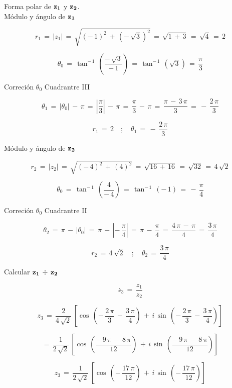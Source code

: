 \documentclass[a4paper,11pt,openany]{book}
\begin{document}
\textcolor{ao(english)}{} Forma polar de $\bf{z_{1}}$ y $\bf{z_{2}}$.\\

\textcolor{ao(english)}{} Módulo y ángulo de $\bf{z_{1}}$ 

$$r_{1}\,=\,|z_{1}|\,=\,\sqrt{(-\,1)^{2}\,+\,(-\,\sqrt{3})^{2}}\,=\,\sqrt{1\,+\,3}\,=\,\sqrt{4}\,=\,2$$

$$\theta_{0}\,=\,\tan^{-\,1}\,\left(\dfrac{-\,\sqrt{3}}{-\,1}\right)\,=\,\tan^{-\,1}\,(\sqrt{3})\,=\,\dfrac{\pi}{3}$$

\textcolor{ao(english)}{} Correción $\theta_{0}$ Cuadrantre III

$$\theta_{1}\,=\,|\theta_{0}|\,-\,\pi\,=\,\left|\dfrac{\pi}{3}\right|\,-\,\pi\,=\,\dfrac{\pi}{3}\,-\,\pi\,=\,\dfrac{\pi\,-\,3\,\pi}{3}\,=\,-\,\dfrac{2\,\pi}{3}$$

$$\boxed{r_{1}\,=\,2 \quad;\quad \theta_{1}\,=\,-\,\dfrac{2\,\pi}{3}}$$

\textcolor{ao(english)}{} Módulo y ángulo de $\bf{z_{2}}$ 

$$r_{2}\,=\,|z_{2}|\,=\,\sqrt{(-\,4)^{2}\,+\,(4)^{2}}\,=\,\sqrt{16\,+\,16}\,=\,\sqrt{32}\,=\,4\,\sqrt{2}$$

$$\theta_{0}\,=\,\tan^{-\,1}\,\left(\dfrac{4}{-\,4}\right)\,=\,\tan^{-\,1}\,(-\,1)\,=\,-\,\dfrac{\pi}{4}$$

\textcolor{ao(english)}{} Correción $\theta_{0}$ Cuadrantre II

$$\theta_{2}\,=\,\pi\,-\,|\theta_{0}|\,=\,\pi\,-\,\left|-\,\dfrac{\pi}{4}\right|\,=\,\pi\,-\,\dfrac{\pi}{4}\,=\,\dfrac{4\,\pi\,-\,\pi}{4}\,=\,\dfrac{3\,\pi}{4}$$

$$\boxed{r_{2}\,=\,4\,\sqrt{2} \quad;\quad \theta_{2}\,=\,\dfrac{3\,\pi}{4}}$$

\textcolor{ao(english)}{} Calcular $\bf{z_{1}\,\div\,z_{2}}$

$$z_{3}\,=\,\dfrac{z_{1}}{z_{2}}$$

$$z_{3}\,=\,\dfrac{2}{4\,\sqrt{2}}\,\left[\cos\,\left(-\,\dfrac{2\,\pi}{3}\,-\,\dfrac{3\,\pi}{4}\right)\,+\,i\,\sin\,\left(-\,\dfrac{2\,\pi}{3}\,-\,\dfrac{3\,\pi}{4}\right)\right]$$

$$=\,\dfrac{1}{2\,\sqrt{2}}\,\left[\cos\,\left(\dfrac{-\,9\,\pi\,-\,8\,\pi}{12}\right)\,+\,i\,\sin\,\left(\dfrac{-\,9\,\pi\,-\,8\,\pi}{12}\right)\right]$$

$$z_{3}\,=\,\dfrac{1}{2\,\sqrt{2}}\,\left[\cos\,\left(-\,\dfrac{17\,\pi}{12}\right)\,+\,i\,\sin\,\left(-\,\dfrac{17\,\pi}{12}\right)\right]$$
\end{document}
